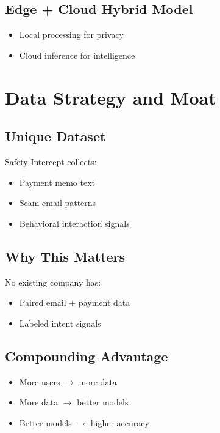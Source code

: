 \documentclass[11pt]{article}
\begin{document}
\subsection{Edge + Cloud Hybrid Model}

\begin{itemize}
    \item Local processing for privacy
    \item Cloud inference for intelligence
\end{itemize}

\section{Data Strategy and Moat}

\subsection{Unique Dataset}

Safety Intercept collects:
\begin{itemize}
    \item Payment memo text
    \item Scam email patterns
    \item Behavioral interaction signals
\end{itemize}

\subsection{Why This Matters}

No existing company has:
\begin{itemize}
    \item Paired email + payment data
    \item Labeled intent signals
\end{itemize}

\subsection{Compounding Advantage}

\begin{itemize}
    \item More users $\rightarrow$ more data
    \item More data $\rightarrow$ better models
    \item Better models $\rightarrow$ higher accuracy
\end{itemize}
\end{document}
